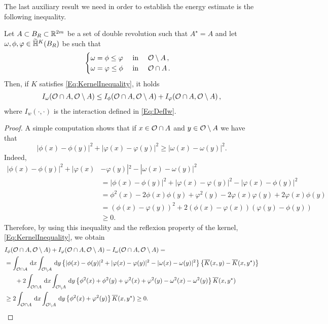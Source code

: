 The last auxiliary result we need in order to establish the energy estimate is the following inequality.

\begin{lemma}
\label{Lemma: InteractionInequalityMinimumFunction}
Let $A\subset B_R \subset \mathbb{R}^{2m}$ be a set of double revolution such that $A^\star = A$ and let $\omega, \phi, \varphi \in \widetilde{\mathbb{H}}^K(B_R)$ be such that
$$\begin{cases}
\omega = \phi \leq \varphi \ \ \ \ \textrm{in } \ \ \ \mathcal{O} \setminus A\,,\\
\omega = \varphi \leq \phi \ \ \ \ \textrm{in } \ \ \ \mathcal{O} \cap A\,.
\end{cases}$$
Then, if $K$ satisfies \eqref{Eq:KernelInequality}, it holds
\begin{align*}
I_\omega(\mathcal{O}\cap A, \mathcal{O} \setminus A) \leq I_\phi(\mathcal{O}\cap A, \mathcal{O} \setminus A) + I_\varphi(\mathcal{O}\cap A, \mathcal{O} \setminus A)\,,
\end{align*}
where $I_w(\cdot, \cdot)$ is the interaction defined in \eqref{Eq:DefIw}.
\end{lemma}

\begin{proof}
A simple computation shows that if $x\in \mathcal{O} \cap A$ and $y\in \mathcal{O} \setminus A$ we have that
$$ |\phi(x)-\phi(y)|^2+|\varphi(x)-\varphi(y)|^2\geq |\omega(x)-\omega(y)|^2. $$
Indeed,
\begin{align*}
|\phi(x)-\phi(y)|^2+|\varphi(x)&-\varphi(y)|^2 - |\omega(x)-\omega(y)|^2 \\
&= |\phi(x)-\phi(y)|^2+|\varphi(x)-\varphi(y)|^2 - |\varphi(x)-\phi(y)|^2 \\
&= \phi^2(x)-2\phi(x)\phi(y)+\varphi^2(y)-2\varphi(x)\varphi(y)+2\varphi(x)\phi(y) \\
&= \left( \phi(x) - \varphi(y)\right) ^2+2\left( \phi(x)-\varphi(x) \right) \left( \varphi(y)-\phi(y) \right) \\
&\geq 0.
\end{align*}
Therefore, by using this inequality and the reflexion property of the kernel, \eqref{Eq:KernelInequality}, we obtain
\begin{align*}
I_\phi(\ocal\cap A, \ocal \setminus A) &+ I_\varphi(\ocal\cap A, \ocal \setminus A) - I_\omega(\ocal\cap A, \ocal \setminus A) = \\
&\hspace{-26mm}= \int_{\ocal\cap A} \d x \int_{\ocal\setminus A} \d y \left\{|\phi(x)-\phi(y)|^2+|\varphi(x)-\varphi(y)|^2-|\omega(x)-\omega(y)|^2 \right\} \left\{\overline{K}(x,y)-\overline{K}(x,y^\star)\right\} \\
&\hspace{-20mm}+ 2 \int_{\ocal\cap A} \d x \int_{\ocal\setminus A} \d y \left\{\phi^2(x)+\phi^2(y)+\varphi^2(x)+\varphi^2(y)-\omega^2(x)-\omega^2(y) \right\} \overline{K}(x,y^\star) \\
&\hspace{-26mm}\geq 2\int_{\ocal\cap A} \d x \int_{\ocal\setminus A} \d y \left\{
\phi^2(x)+\varphi^2(y)\right\} \overline{K}(x,y^\star) \geq 0.
\end{align*}
\end{proof}



